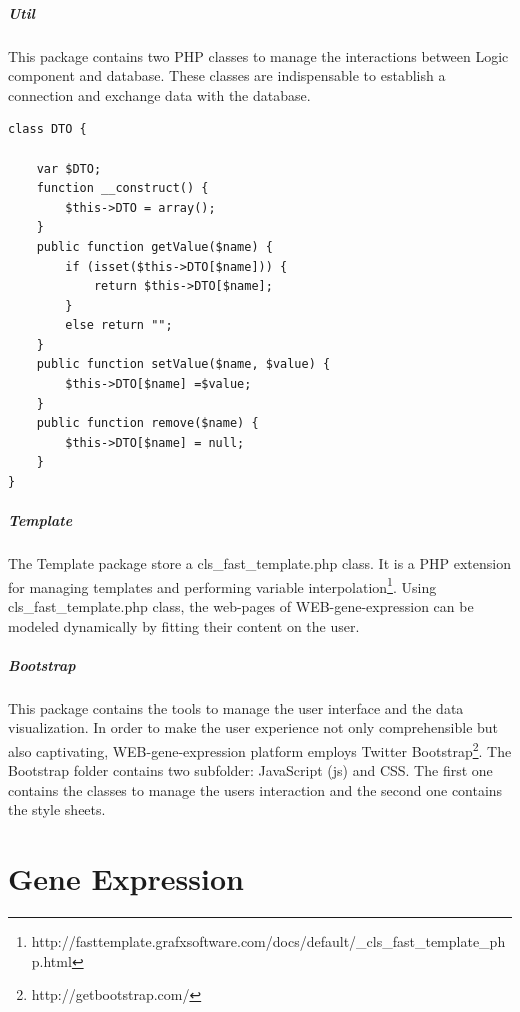 \documentclass[a4paper]{report}
\begin{document}
\paragraph{Util} This package contains two PHP classes to manage the interactions between Logic component and database. These classes are indispensable to establish a connection and exchange data with the database.
\begin{lstlisting}[title={DTO.php class.},frame=trBL]	
class DTO {

	var $DTO;
	function __construct() {
		$this->DTO = array();
	}
	public function getValue($name) {
		if (isset($this->DTO[$name])) {
			return $this->DTO[$name];
		}
		else return "";
	}
	public function setValue($name, $value) {
		$this->DTO[$name] =$value;
	}
	public function remove($name) {
		$this->DTO[$name] = null;
	}
}
\end{lstlisting}

\paragraph{Template} The Template package store a cls\_fast\_template.php class. It is a PHP extension for managing templates and performing variable interpolation\footnote{http://fasttemplate.grafxsoftware.com/docs/default/\_cls\_fast\_template\_php.html}.
Using cls\_fast\_template.php class, the web-pages of WEB-gene-expression can be modeled dynamically by fitting their content on the user.

\paragraph{Bootstrap} This package contains the tools to manage the user interface and the data visualization. In order to make the user experience not only comprehensible but also captivating, WEB-gene-expression platform employs Twitter Bootstrap\footnote{http://getbootstrap.com/}. The Bootstrap folder contains two subfolder: JavaScript (js) and CSS. The first one contains the classes to manage the users interaction and the second one contains the style sheets. 

\chapter{Gene Expression}
\end{document}
